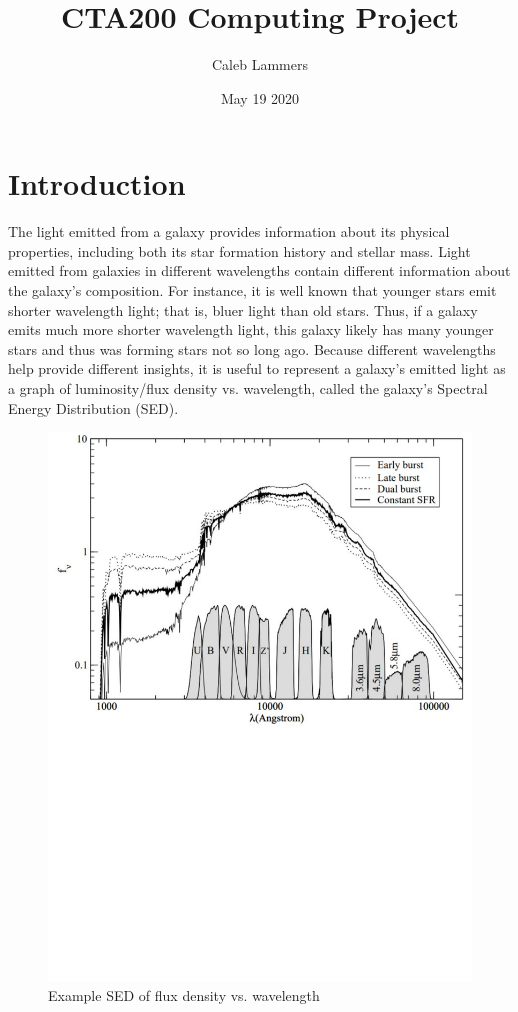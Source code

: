 \documentclass{article}
\title{CTA200 Computing Project}
\author{Caleb Lammers}
\date{May 19 2020}
\begin{document}
\maketitle

\section*{Introduction}

The light emitted from a galaxy provides information about its physical properties, including both
its star formation history and stellar mass. Light emitted from galaxies in different wavelengths
contain different information about the galaxy's composition. For instance, it is well known that
younger stars emit shorter wavelength light; that is, bluer light than old stars. Thus, if a galaxy
emits much more shorter wavelength light, this galaxy likely has many younger stars and thus was forming
stars not so long ago. Because different wavelengths help provide different insights, it is useful
to represent a galaxy's emitted light as a graph of luminosity/flux density vs. wavelength, called
the galaxy's Spectral Energy Distribution (SED).

\begin{figure}[h]
  \centering
\includegraphics[scale=0.4]{SED Example}
\caption{Example SED of flux density vs. wavelength}
\end{figure}
\end{document}

